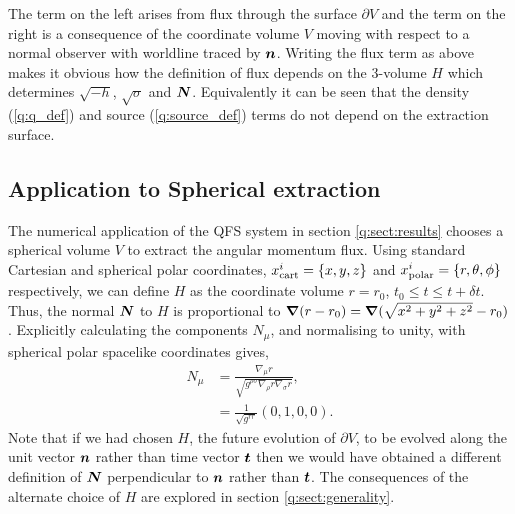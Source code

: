 The term on the left arises from flux through the surface $\partial V$ and the term on the right is a consequence of the coordinate volume $V$ moving with respect to a normal observer with worldline traced by $\boldsymbol{n}$. Writing the flux term as above makes it obvious how the definition of flux depends on the 3-volume $H$ which determines $\sqrt{-h}$, $\sqrt{\sigma}$ and $\boldsymbol{N}$. Equivalently it can be seen that the density (\ref{q:q_def}) and source (\ref{q:source_def}) terms do not depend on the extraction surface.










\subsection{Application to Spherical extraction} \label{q:sect:sphere}
The numerical application of the QFS system in section \ref{q:sect:results} chooses a spherical volume $V$ to extract the angular momentum flux. Using standard Cartesian and spherical polar coordinates, $x^i_{\rm{cart}} = \{x,y,z\}$ and $x^i_{\rm{polar}}=\{r,\theta,\phi\}$ respectively, we can define $H$ as the coordinate volume $r=r_0$, $t_0\leq t \leq t+\delta t$. Thus, the normal $\boldsymbol{N}$ to $H$ is proportional to $\boldsymbol{\nabla}(r-r_0) = \boldsymbol{\nabla}(\sqrt{x^2 + y^2 + z^2}-r_0)$. Explicitly calculating the components $N_\mu$, and normalising to unity, with spherical polar spacelike coordinates gives,
\begin{align}
N_\mu &= \frac{\nabla_\mu r}{\sqrt{g^{\rho\sigma} \nabla_\rho r \nabla_\sigma r}}, \\
     \label{q:radial_N} &= \frac{1}{\sqrt{g^{rr}}}(0,1,0,0).
\end{align}
Note that if we had chosen $H$, the future evolution of $\partial V$, to be evolved along the unit vector $\boldsymbol{n}$ rather than time vector $\boldsymbol{t}$ then we would have obtained a different definition of $\boldsymbol{N}$ perpendicular to $\boldsymbol{n}$ rather than $\boldsymbol{t}$. The consequences of the alternate choice of $H$ are explored in section \ref{q:sect:generality}.


